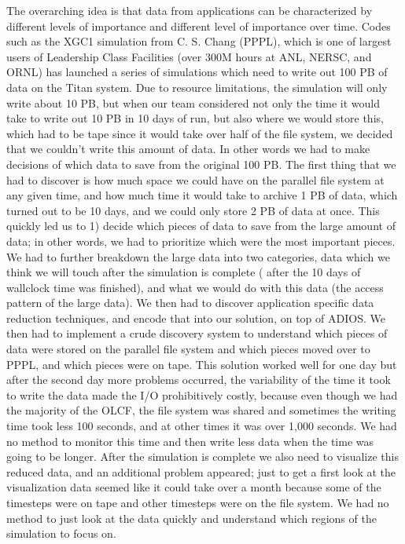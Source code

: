 The overarching idea is that data from applications can be characterized by different
levels of importance and different level of importance over time. 
Codes such as the XGC1 simulation from C. S. Chang (PPPL), which is one of largest users of Leadership Class Facilities (over 300M hours at ANL, NERSC, and ORNL) has launched a series of simulations which need to write out 100 PB of data on the Titan system. Due to resource limitations, the simulation will only write about 10 PB, but
when our team considered not only the time it would take to write out 10 PB in 10 days of run, but also where we would store this, which had to be tape since it would take
over half of the file system, we decided that we couldn't write this amount of data. In other words we had to make decisions of which data to save from the original 100 PB.
The first thing that we had to discover is how much space we could have on the parallel file system at any given time, and how much time it would take to archive 1 PB of data,
which turned out to be 10 days, and we could only store 2 PB of data at once. This quickly led us to 1) decide which pieces of data to save from the large amount of data; in 
other words, we had to prioritize which were the most important pieces. We had to further breakdown the large data into two categories, data which we think we will touch after
the simulation is complete ( after the 10 days of wallclock time was finished), and what we would do with this data (the access pattern of the large data). We then had to 
discover application specific data reduction techniques, and encode that into our solution, on top of ADIOS. We then had to implement a crude discovery system to understand
which pieces of data were stored on the parallel file system and which pieces moved over to PPPL, and which pieces were on tape.  This solution worked well for one day
but after the second day more problems occurred, the variability of the time it took to write the data made the I/O prohibitively costly, because even though we had the
majority of the OLCF, the file system was shared and sometimes the writing time took less 100 seconds, and at other times it was over 1,000 seconds. We had no method
to monitor this time and then write less data when the time was going to be longer.   After the simulation is complete we also need to visualize this reduced data, and 
an additional problem appeared; just to get a first look at the visualization data seemed like it could take over a month because some of the timesteps were on tape and other
timesteps were on the file system. We had no method to just look at the data quickly and understand which regions of the simulation to focus on. 


